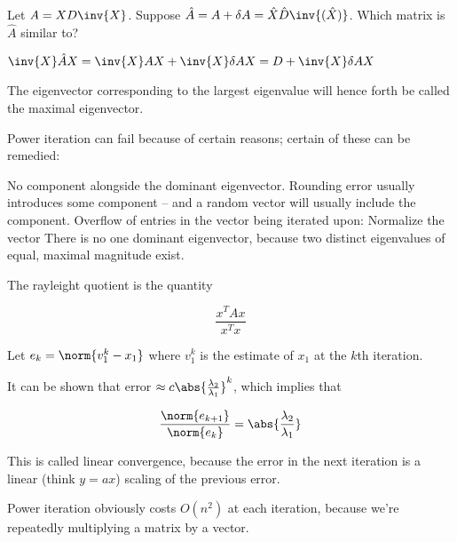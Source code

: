 \documentclass[../main.tex]{subfiles}
\begin{document}
\begin{problem}
    Let $A = XD\inv{X}$. Suppose $\hat{A} = A + \delta A = \hat{X} \hat{D} \inv{(\hat{X})}$. Which matrix is $\hat{A}$ similar to?
\end{problem}

\begin{solution}
    $\inv{X}\hat{A} X = \inv{X}AX + \inv{X}\delta A X = D + \inv{X} \delta A X$
\end{solution}

\begin{definition}
    The eigenvector corresponding to the largest eigenvalue will hence forth be called the maximal eigenvector. 
\end{definition}

\begin{remark}
    Power iteration can fail because of certain reasons; certain of these can be remedied:

    \begin{outline}
        \1 No component alongside the dominant eigenvector.
        \2 Rounding error usually introduces some component -- and a random vector will usually include the component.
        \1 Overflow of entries in the vector being iterated upon:
        \2 Normalize the vector
        \1 There is no one dominant eigenvector, because two distinct eigenvalues of equal, maximal magnitude exist.
    \end{outline}
    
\end{remark}

\begin{definition}
    The rayleight quotient is the quantity

    \[
        \frac{x^T Ax}{x^Tx}
    \]
\end{definition}

\begin{remark}
    Let $e_k = \norm{v_1^{k} - x_1}$ where $v_1^k$ is the estimate of $x_1$ at the $k$th iteration.

    It can be shown that error $\approx c \abs{\frac{\lambda_2}{\lambda_1}}^k$, which implies that

    \[
        \frac{\norm{e_{k+1}}}{\norm{e_k}} = \abs{\frac{\lambda_2}{\lambda_1}}
    \]

    This is called linear convergence, because the error in the next iteration is a linear (think $y = ax$) scaling of the previous error.

    Power iteration obviously costs $O(n^2)$ at each iteration, because we're repeatedly multiplying a matrix by a vector.
\end{remark}
\end{document}
